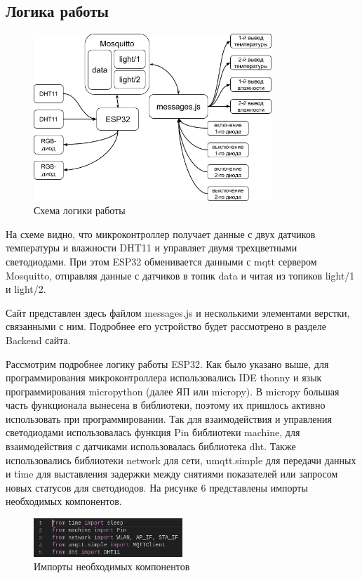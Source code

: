\subsection{Логика работы}
\mbox{}
\begin{figure}[h!]
	\centering
	\includegraphics[width=0.8\textwidth]{./graphics/img/image36.png}
	\caption{Схема логики работы}
	\label{fig:img36}
\end{figure}

На схеме видно, что микроконтроллер получает данные с двух датчиков температуры и влажности DHT11 и управляет двумя трехцветными светодиодами. При этом ESP32 обменивается данными с mqtt сервером Mosquitto, отправляя данные с датчиков в топик data и читая из топиков light/1 и light/2.

Сайт представлен здесь файлом messages.js и несколькими элементами верстки, связанными с ним. Подробнее его устройство будет рассмотрено в разделе Backend сайта.

Рассмотрим подробнее логику работы ESP32. Как было указано выше, для программирования микроконтроллера использовались IDE thonny и язык программирования micropython (далее ЯП или micropy). В micropy большая часть функционала вынесена в библиотеки, поэтому их пришлось активно использовать при программировании. Так для взаимодействия и управления светодиодами использовалась функция Pin библиотеки machine, для взаимодействия с датчиками использовалась библиотека dht. Также использовались библиотеки network для сети, umqtt.simple для передачи данных и time для выставления задержки между снятиями показателей или запросом новых статусов для светодиодов. На рисунке 6 представлены импорты необходимых компонентов.

\begin{figure}[h!]
	\centering
	\includegraphics[width=0.5\textwidth]{./graphics/img/image37.png}
	\caption{Импорты необходимых компонентов}
	\label{fig:img37}
\end{figure}

